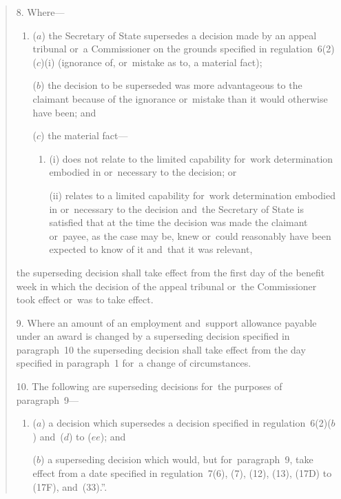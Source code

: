 \documentclass[12pt,a4paper]{article}
\begin{document}
\begin{quotation}
8.  Where—
\begin{enumerate}\item[]
($a$) the Secretary of State supersedes a decision made by an appeal tribunal or~a Commissioner on the grounds specified in regulation~6(2)($c$)(i)  (ignorance of, or~mistake as to, a material fact);

($b$) the decision to be superseded was more advantageous to the claimant because of the ignorance or~mistake than it would otherwise have been; and

($c$) the material fact—
\begin{enumerate}\item[]
(i) does not relate to the limited capability for~work determination embodied in or~necessary to the decision; or

(ii) relates to a limited capability for~work determination embodied in or~necessary to the decision and~the Secretary of State is satisfied that at the time the decision was made the claimant or~payee, as the case may be, knew or~could reasonably have been expected to know of it and~that it was relevant,
\end{enumerate}
\end{enumerate}
the superseding decision shall take effect from the first day of the benefit week in which the decision of the appeal tribunal or~the Commissioner took effect or~was to take effect.

\medskip

9.  Where an amount of an employment and~support allowance payable under an award is changed by a superseding decision specified in paragraph~10 the superseding decision shall take effect from the day specified in paragraph~1 for~a change of circumstances.

\medskip

10.  The following are superseding decisions for~the purposes of paragraph~9—
\begin{enumerate}\item[]
($a$) a decision which supersedes a decision specified in regulation~6(2)($b$)  and~($d$)  to ($ee$); and

\enlargethispage{-6\baselineskip}

\begin{sloppypar}
($b$) a superseding decision which would, but for~paragraph~9, take effect from a date specified in regulation~7(6), (7), (12), (13), (17D) to (17F), and~(33).”.
\end{sloppypar}
\end{enumerate}
\end{quotation}
\end{document}
